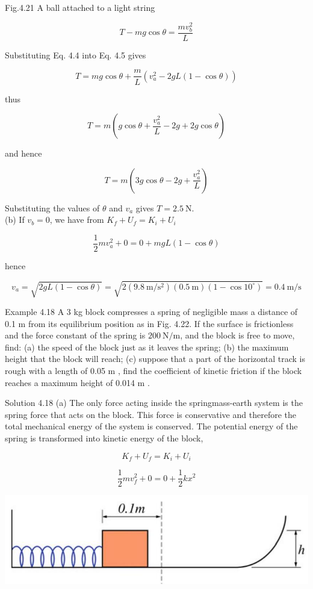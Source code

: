 \documentclass[10pt]{article}
\begin{document}
Fig.4.21 A ball attached to a light string


\begin{equation*}
T-m g \cos \theta=\frac{m v_{b}^{2}}{L} \tag{4.5}
\end{equation*}


Substituting Eq. 4.4 into Eq. 4.5 gives

$$
T=m g \cos \theta+\frac{m}{L}\left(v_{a}^{2}-2 g L(1-\cos \theta)\right)
$$

thus

$$
T=m\left(g \cos \theta+\frac{v_{a}^{2}}{L}-2 g+2 g \cos \theta\right)
$$

and hence

$$
T=m\left(3 g \cos \theta-2 g+\frac{v_{a}^{2}}{L}\right)
$$

Substituting the values of $\theta$ and $v_{a}$ gives $T=2.5 \mathrm{~N}$.\\
(b) If $v_{b}=0$, we have from $K_{f}+U_{f}=K_{i}+U_{i}$

$$
\frac{1}{2} m v_{a}^{2}+0=0+m g L(1-\cos \theta)
$$

hence

$$
v_{a}=\sqrt{2 g L(1-\cos \theta)}=\sqrt{2\left(9.8 \mathrm{~m} / \mathrm{s}^{2}\right)(0.5 \mathrm{~m})\left(1-\cos 10^{\circ}\right)}=0.4 \mathrm{~m} / \mathrm{s}
$$

Example 4.18 A 3 kg block compresses a spring of negligible mass a distance of 0.1 m from its equilibrium position as in Fig. 4.22. If the surface is frictionless and the force constant of the spring is $200 \mathrm{~N} / \mathrm{m}$, and the block is free to move, find: (a) the speed of the block just as it leaves the spring; (b) the maximum height that the block will reach; (c) suppose that a part of the horizontal track is rough with a length of 0.05 m , find the coefficient of kinetic friction if the block reaches a maximum height of 0.014 m .

Solution 4.18 (a) The only force acting inside the springmass-earth system is the spring force that acts on the block. This force is conservative and therefore the total mechanical energy of the system is conserved. The potential energy of the spring is transformed into kinetic energy of the block,

$$
K_{f}+U_{f}=K_{i}+U_{i}
$$

$$
\frac{1}{2} m v_{f}^{2}+0=0+\frac{1}{2} k x^{2}
$$

\begin{center}
\includegraphics[max width=\textwidth]{2024_09_13_db1f357d2aad0a03eb2eg-075}
\end{center}
\end{document}
